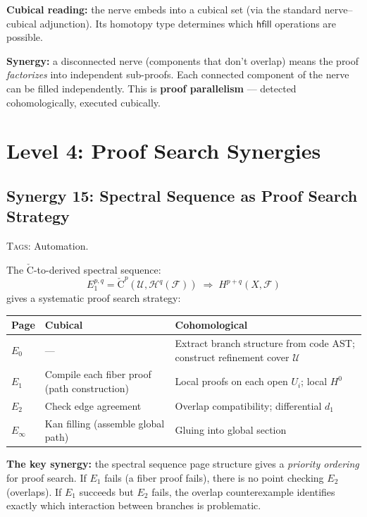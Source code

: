 \documentclass[11pt,a4paper]{article}
\theoremstyle{definition}
\theoremstyle{plain}
\newcommand{\Cech}{\check{\mathrm{C}}}
\newcommand{\covers}{\mathcal{U}}
\newcommand{\Hzero}{H^0}
\newcommand{\presheaf}{\mathcal{F}}
\newcommand{\hfilling}{\mathsf{hfill}}
\begin{document}
\textbf{Cubical reading:} the nerve embeds into a cubical set
(via the standard nerve--cubical adjunction).  Its homotopy type
determines which $\hfilling$ operations are possible.

\textbf{Synergy:} a disconnected nerve (components that don't
overlap) means the proof \emph{factorizes} into independent
sub-proofs.  Each connected component of the nerve can be filled
independently.  This is \textbf{proof parallelism} --- detected
cohomologically, executed cubically.


\section{Level 4: Proof Search Synergies}
\label{sec:syn-search}


\subsection{Synergy 15: Spectral Sequence as Proof Search Strategy}
\label{sec:syn-spectral}

\textsc{Tags:} Automation.

\medskip\noindent
The $\Cech$-to-derived spectral sequence:
\[
  E_1^{p,q} = \Cech^p(\covers, \mathcal{H}^q(\presheaf))
  \;\Rightarrow\;
  H^{p+q}(X, \presheaf)
\]
gives a systematic proof search strategy:

\begin{center}
\begin{tabular}{llp{6.5cm}}
\toprule
\textbf{Page} & \textbf{Cubical} & \textbf{Cohomological} \\
\midrule
$E_0$ & --- &
  Extract branch structure from code AST; construct
  refinement cover $\covers$ \\
$E_1$ & Compile each fiber proof (path construction) &
  Local proofs on each open $U_i$; local $\Hzero$ \\
$E_2$ & Check edge agreement &
  Overlap compatibility; differential $d_1$ \\
$E_\infty$ & Kan filling (assemble global path) &
  Gluing into global section \\
\bottomrule
\end{tabular}
\end{center}

\textbf{The key synergy:} the spectral sequence page structure
gives a \emph{priority ordering} for proof search.  If $E_1$ fails
(a fiber proof fails), there is no point checking $E_2$ (overlaps).
If $E_1$ succeeds but $E_2$ fails, the overlap counterexample
identifies exactly which interaction between branches is problematic.
\end{document}
